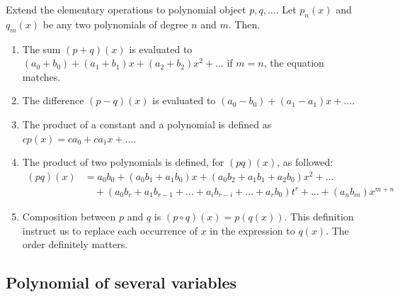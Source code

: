 \begin{theorem}
    Extend the elementary operations to polynomial object $p,q,\dots$. Let $p_{n}(x)$ and $q_{m}(x)$ be any two polynomials of degree $n$ and $m$. Then. 
    \begin{enumerate}[leftmargin = 2cm]
        \item The sum $(p+q)(x)$ is evaluated to $(a_{0}+b_{0})+(a_{1}+b_{1})x+(a_{2}+b_{2})x^{2}+\dots$ if $m=n$, the equation matches. 
        \item The difference $(p-q)(x)$ is evaluated to $(a_{0}-b_{0})+(a_{1}-a_{1})x+\dots$. 
        \item The product of a constant and a polynomial is defined as $cp(x)=ca_{0}+ca_{1}x+\dots$. 
        \item The product of two polynomials is defined, for $(pq)(x)$, as followed: 
        \begin{equation}
            \begin{split}
                (pq)(x) &= a_{0}b_{0} + (a_0 b_{1} + a_{1}b_{0})x + (a_0 b_{2} + a_{1}b_{1}+ a_{2}b_{0})x^{2} + \dots\\
                & \quad   + (a_{0}b_{r}+a_{1}b_{r-1}+\dots+ a_{i}b_{r-i}+\dots+ a_{r}b_{0})t^{r} +\dots + (a_{n}b_{m})x^{m+n}
            \end{split}
        \end{equation}
        \item Composition between $p$ and $q$ is $(p\circ q )(x)= p(q(x))$. This definition instruct us to replace each occurrence of $x$ in the expression to $q(x)$. The order definitely matters. 
    \end{enumerate}
\end{theorem}

\subsection{Polynomial of several variables}

